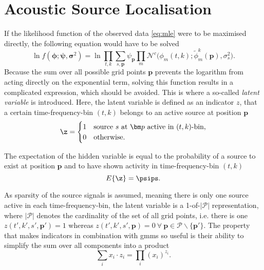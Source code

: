 \section{Acoustic Source Localisation}
\label{sec:algLocEst}

If the likelihood function of the observed data \eqref{eq:mle} were to be maximised directly, the following equation would have to be solved
\begin{equation}
    \ln f(\bm\phi;\bm\psi,\bm\sigma^2) = \ln\prod_{t,k}\sum_{s,\bm p}\psi_{\bm p}\prod_m\mathcal{N}^c\big(\phi_m(t,k);\tilde\phi^k_m(\bm p),\sigma^2_{s}\big).
\end{equation}
Because the sum over all possible grid points $\bm p$ prevents the logarithm from acting directly on the exponential term, solving this function results in a complicated expression, which should be avoided. This is where a so-called \textit{latent variable} is introduced. Here, the latent variable is defined as an indicator $z$, that a certain time-frequency-bin $(t,k)$ belongs to an active source at position $\bm p$ 
\begin{equation}
	\z=\begin{cases}
	    1& \text{source $s$ at $\bm p$ active in $(t,k)$-bin},\\
       0& \text{otherwise}.
	\end{cases}
\end{equation}

The expectation of the hidden variable is equal to the probability of a source to exist at position $\bm p$ and to have shown activity in time-frequency-bin $(t, k)$ 
\begin{equation}
    E\{\z\}=\psips.
\end{equation}

As sparsity of the source signals is assumed, meaning there is only one source active in each time-frequency-bin, the latent variable is a 1-of-$|\mathcal{P}|$ representation, where $|\mathcal{P}|$ denotes the cardinality of the set of all grid points, i.e. there is one $z(t',k',s',\bm p')=1$ whereas $z(t',k',s',\bm p)=0\ \forall\ \bm p\in\mathcal{P}\smallsetminus\{\bm p'\}$. The property that makes indicators in combination with \glspl{gmm} so useful is their ability to simplify the sum over all components into a product
\begin{equation}
\label{eq:indicator-sum-product}
    \sum_{i}x_i\cdot z_i=\prod_i (x_i)^{z_i}.
\end{equation}

